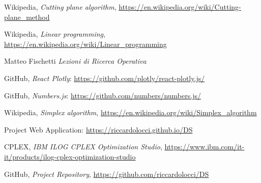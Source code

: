 \documentclass[9pt]{extarticle}
\begin{document}
    \begin{thebibliography}{7}

        Wikipedia,
        \textit{Cutting plane algorithm},
        \url{https://en.wikipedia.org/wiki/Cutting-plane_method}

        Wikipedia,
        \textit{Linear programming},
        \url{https://en.wikipedia.org/wiki/Linear_programming}

        Matteo Fischetti
        \textit{ Lezioni di Ricerca Operativa }

        GitHub,
        \textit{React Plotly}:
        \url{https://github.com/plotly/react-plotly.js/}

        GitHub,
        \textit{Numbers.js}:
        \url{https://github.com/numbers/numbers.js/}

        Wikipedia,
        \textit{Simplex algorithm},
        \url{https://en.wikipedia.org/wiki/Simplex_algorithm}

        Project Web Application: \url{https://riccardolocci.github.io/DS}
        
        CPLEX,
        \textit{IBM ILOG CPLEX Optimization Studio},
        \url{https://www.ibm.com/it-it/products/ilog-cplex-optimization-studio}

        GitHub,
        \textit{Project Repository},
        \url{https://github.com/riccardolocci/DS}

    \end{thebibliography}
\end{document}
